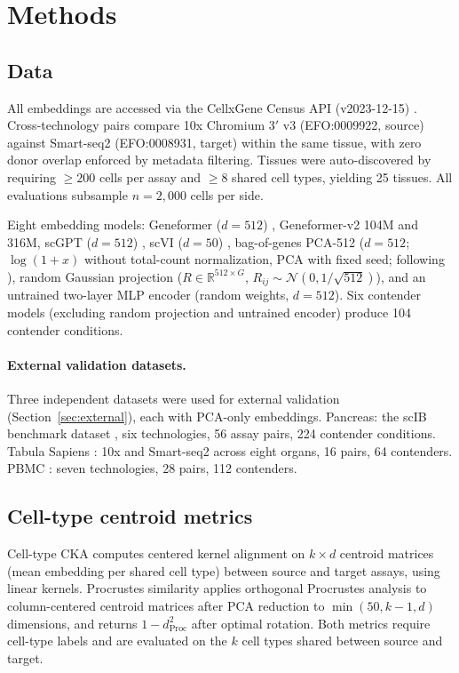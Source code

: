 \documentclass[11pt]{article}
\begin{document}
\section{Methods}

\subsection{Data}

All embeddings are accessed via the CellxGene Census API (v2023-12-15)
\citep{abdulla2025cellxgene}. Cross-technology pairs compare 10x
Chromium 3$'$ v3 (EFO:0009922, source) against Smart-seq2
(EFO:0008931, target) within the same tissue, with zero donor overlap
enforced by metadata filtering. Tissues were auto-discovered by
requiring $\geq 200$ cells per assay and $\geq 8$ shared cell types,
yielding 25 tissues. All evaluations subsample $n = 2{,}000$ cells per
side.

Eight embedding models: Geneformer ($d = 512$)
\citep{theodoris2023geneformer}, Geneformer-v2 104M and 316M,
scGPT ($d = 512$) \citep{cui2024scgpt}, scVI ($d = 50$)
\citep{lopez2018scvi}, bag-of-genes PCA-512 ($d = 512$;
$\log(1 + x)$ without total-count normalization, PCA with fixed seed;
following \citealp{cole2026morpheus}), random Gaussian projection
($R \in \mathbb{R}^{512 \times G}$, $R_{ij} \sim \mathcal{N}(0,
1/\sqrt{512})$), and an untrained two-layer MLP encoder (random weights,
$d = 512$). Six contender models (excluding random projection and
untrained encoder) produce 104 contender conditions.

\paragraph{External validation datasets.} Three independent datasets
were used for external validation (Section~\ref{sec:external}), each
with PCA-only embeddings. Pancreas: the scIB benchmark dataset
\citep{luecken2022scib}, six technologies, 56 assay pairs, 224
contender conditions. Tabula Sapiens \citep{tabulasapiens2022}: 10x and
Smart-seq2 across eight organs, 16 pairs, 64 contenders. PBMC
\citep{ding2020systematic}: seven technologies, 28 pairs, 112
contenders.

\subsection{Cell-type centroid metrics}

Cell-type CKA \citep{kornblith2019similarity} computes centered kernel
alignment on $k \times d$ centroid matrices (mean embedding per shared
cell type) between source and target assays, using linear kernels.
Procrustes similarity applies orthogonal Procrustes analysis to
column-centered centroid matrices after PCA reduction to $\min(50,
k-1, d)$ dimensions, and returns $1 - d_{\mathrm{Proc}}^2$ after
optimal rotation. Both metrics require cell-type labels and are
evaluated on the $k$ cell types shared between source and target.
\end{document}
